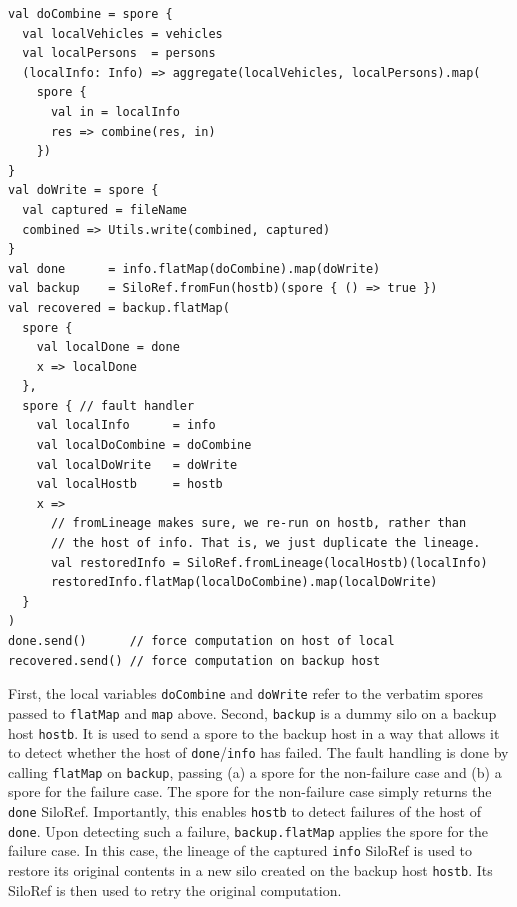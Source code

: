 \documentclass{jfp1}
\begin{document}
\begin{lstlisting}
val doCombine = spore {
  val localVehicles = vehicles
  val localPersons  = persons
  (localInfo: Info) => aggregate(localVehicles, localPersons).map(
    spore {
      val in = localInfo
      res => combine(res, in)
    })
}
val doWrite = spore {
  val captured = fileName
  combined => Utils.write(combined, captured)
}
val done      = info.flatMap(doCombine).map(doWrite)
val backup    = SiloRef.fromFun(hostb)(spore { () => true })
val recovered = backup.flatMap(
  spore {
    val localDone = done
    x => localDone
  },
  spore { // fault handler
    val localInfo      = info
    val localDoCombine = doCombine
    val localDoWrite   = doWrite
    val localHostb     = hostb
    x =>
      // fromLineage makes sure, we re-run on hostb, rather than
      // the host of info. That is, we just duplicate the lineage.
      val restoredInfo = SiloRef.fromLineage(localHostb)(localInfo)
      restoredInfo.flatMap(localDoCombine).map(localDoWrite)
  }
)
done.send()      // force computation on host of local
recovered.send() // force computation on backup host
\end{lstlisting}
\noindent

First, the local variables \verb|doCombine| and \verb|doWrite| refer to the
verbatim spores passed to \verb|flatMap| and \verb|map| above. Second,
\verb|backup| is a dummy silo on a backup host \verb|hostb|. It is used to send
a spore to the backup host in a way that allows it to detect whether the host of
\verb|done|/\verb|info| has failed. The fault handling is done by calling
\verb|flatMap| on \verb|backup|, passing (a) a spore for the non-failure case
and (b) a spore for the failure case. The spore for the non-failure case simply
returns the \verb|done| SiloRef. Importantly, this enables \verb|hostb| to
detect failures of the host of \verb|done|. Upon detecting such a failure,
\verb|backup.flatMap| applies the spore for the failure case. In this case, the
lineage of the captured \verb|info| SiloRef is used to restore its original
contents in a new silo created on the backup host \verb|hostb|. Its SiloRef is
then used to retry the original computation.
\end{document}
